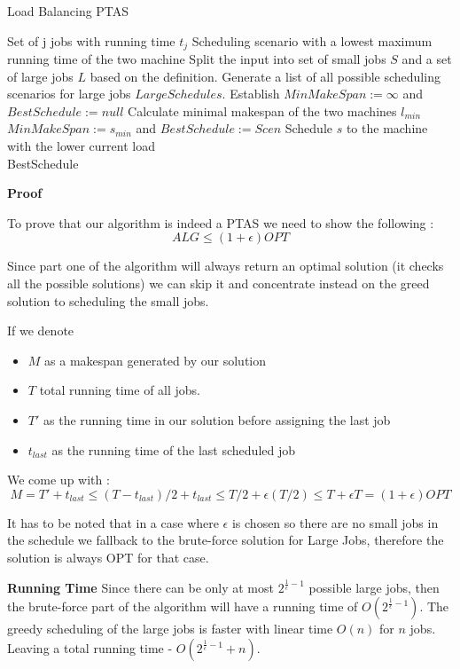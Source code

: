 \begin{algorithm}[H]
  \caption{Load Balancing PTAS}
  \label{alg:load_balancing_ptas}
  \begin{algorithmic}
    \Require Set of j jobs with running time $t_j$
    \Ensure Scheduling scenario with a lowest maximum running time of the two machine 
    \renewcommand{\algorithmicrequire}{\textbf{Input:}}
    \renewcommand{\algorithmicensure}{\textbf{Output:}}
    \algnewcommand{}
    \algnewcommand\Operation{\item[\algorithmicoperation]}
    \Operation
    \State Split the input into set of small jobs $ S $ and a set of large jobs $ L $  based on the definition.
    \State Generate a list of all possible scheduling scenarios for large jobs $ LargeSchedules $.
    \State Establish $ MinMakeSpan := \infty $ and $ BestSchedule:= null $
    \State Calculate minimal makespan of the two machines $ l_{min} $
    \State $ MinMakeSpan := s_{min} $ and $ BestSchedule := Scen $
    \EndIf
    \EndFor
    \State Schedule $ s $ to the machine with the lower current load
    \EndFor\\
    \Return BestSchedule
  \end{algorithmic}
\end{algorithm}

\textbf{Proof}

To prove that our algorithm is indeed a PTAS we need to show the following :
$$ ALG \le (1 + \epsilon ) OPT $$ 

Since part one of the algorithm will always return an optimal solution (it checks all 
the possible solutions) we can skip it and concentrate instead on the greed solution
to scheduling the small jobs.

If we denote 
\begin{itemize}
	\item $ M $ as a makespan generated by our solution
	\item $ T $ total running time of all jobs.
	\item $ T' $ as the running time in our solution before assigning the last job
	\item $ t_{last} $ as the running time of the last scheduled job
\end{itemize}
We come up with :
$$ M = T' + t_{last} \le ( T - t_{last} )/2 + t_{last} \le T/2 + \epsilon (T/2) \le T + \epsilon T = (1 + \epsilon ) OPT $$

It has to be noted that in a case where $ \epsilon $ is chosen so there are no small jobs in the schedule we fallback to the brute-force solution for Large Jobs, therefore the solution is always OPT for that case.

\textbf{Running Time}
Since there can be only at most $ 2^{\frac{1}{\epsilon}-1} $ possible large jobs, then the brute-force part of the algorithm will have a running time of $ O(2^{\frac{1}{\epsilon}-1}) $. The greedy scheduling of the large jobs is faster with linear time $ O(n) $ for $ n $ jobs. Leaving a total running time - $ O(2^{\frac{1}{\epsilon}-1} + n) $.

